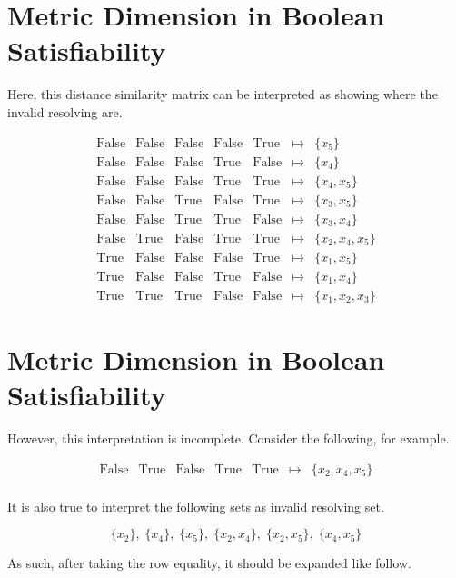 \documentclass[12pt]{article}
\def\True{\mathrm{True}}
\def\False{\mathrm{False}}
\begin{document}
\newpage
\section*{Metric Dimension in Boolean Satisfiability}

Here, this distance similarity matrix can be interpreted as showing where the invalid resolving are.

\[
\begin{array}{ccccccl}
	\False & \False & \False & \False &  \True & \mapsto & \{x_5\} \\
	\False & \False & \False &  \True & \False & \mapsto & \{x_4\} \\
	\False & \False & \False &  \True &  \True & \mapsto & \{x_4, x_5\} \\
	\False & \False &  \True & \False &  \True & \mapsto & \{x_3, x_5\} \\
	\False & \False &  \True &  \True & \False & \mapsto & \{x_3, x_4\} \\
	\False &  \True & \False &  \True &  \True & \mapsto & \{x_2, x_4, x_5\} \\
	 \True & \False & \False & \False &  \True & \mapsto & \{x_1, x_5\} \\
	 \True & \False & \False &  \True & \False & \mapsto & \{x_1, x_4\} \\
	 \True &  \True &  \True & \False & \False & \mapsto & \{x_1, x_2, x_3\}
\end{array}
\]

\newpage
\section*{Metric Dimension in Boolean Satisfiability}

However, this interpretation is incomplete. Consider the following, for example.

\[
\begin{array}{ccccccl}
	\False &  \True & \False &  \True &  \True & \mapsto & \{x_2, x_4, x_5\} \\
\end{array}
\]

It is also true to interpret the following sets as invalid resolving set.

\[ \{x_2\},\; \{x_4\},\; \{x_5\},\; \{x_2, x_4\},\; \{x_2, x_5\},\; \{x_4, x_5\} \]

As such, after taking the row equality, it should be expanded like follow.
\end{document}
